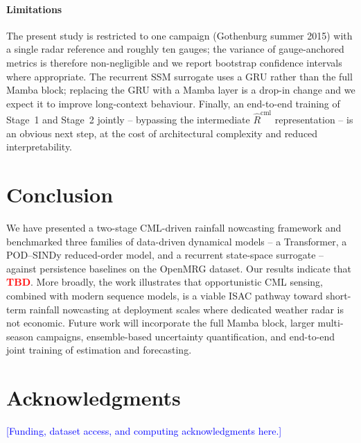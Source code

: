 \documentclass[conference]{IEEEtran}
\newcommand{\tbd}{\textcolor{red}{\textbf{TBD}}}
\newcommand{\note}[1]{\textcolor{blue}{[#1]}}
\begin{document}
\paragraph*{Limitations}
The present study is restricted to one campaign (Gothenburg summer 2015)
with a single radar reference and roughly ten gauges; the variance of
gauge-anchored metrics is therefore non-negligible and we report
bootstrap confidence intervals where appropriate. The recurrent SSM
surrogate uses a GRU rather than the full Mamba block; replacing the
GRU with a Mamba layer is a drop-in change and we expect it to improve
long-context behaviour. Finally, an end-to-end training of Stage~1 and
Stage~2 jointly -- bypassing the intermediate
$\widehat{R}^{\mathrm{cml}}$ representation -- is an obvious next step,
at the cost of architectural complexity and reduced interpretability.

\section{Conclusion}
\label{sec:conclusion}

We have presented a two-stage CML-driven rainfall nowcasting framework
and benchmarked three families of data-driven dynamical models -- a
Transformer, a POD--SINDy reduced-order model, and a recurrent
state-space surrogate -- against persistence baselines on the OpenMRG
dataset. Our results indicate that \tbd{}. More broadly, the work
illustrates that opportunistic CML sensing, combined with modern
sequence models, is a viable ISAC pathway toward short-term rainfall
nowcasting at deployment scales where dedicated weather radar is not
economic. Future work will incorporate the full Mamba block, larger
multi-season campaigns, ensemble-based uncertainty quantification, and
end-to-end joint training of estimation and forecasting.

\section*{Acknowledgments}
\note{Funding, dataset access, and computing acknowledgments here.}



\end{document}

